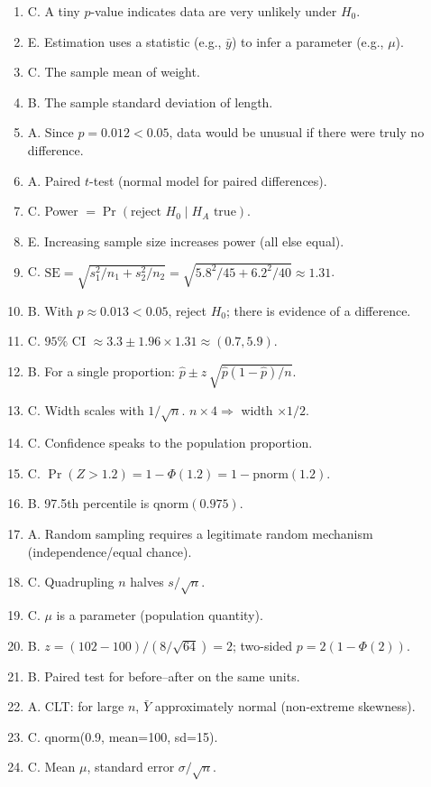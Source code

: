 \documentclass{article}
\begin{document}
\begin{enumerate}
\item C. A tiny $p$-value indicates data are very unlikely under $H_0$.
\item E. Estimation uses a statistic (e.g., $\bar y$) to infer a parameter (e.g., $\mu$).
\item C. The sample mean of weight.
\item B. The sample standard deviation of length.
\item A. Since $p=0.012<0.05$, data would be unusual if there were truly no difference.
\item A. Paired $t$-test (normal model for paired differences).
\item C. Power $=\Pr(\text{reject }H_0\mid H_A\text{ true})$.
\item E. Increasing sample size increases power (all else equal).
\item C. $\mathrm{SE}=\sqrt{s_1^2/n_1+s_2^2/n_2}=\sqrt{5.8^2/45+6.2^2/40}\approx 1.31$.
\item B. With $p\approx 0.013<0.05$, reject $H_0$; there is evidence of a difference.
\item C. $95\%$ CI $\approx 3.3 \pm 1.96\times 1.31 \approx (0.7,5.9)$.
\item B. For a single proportion: $\hat p \pm z\,\sqrt{\hat p(1-\hat p)/n}$.
\item C. Width scales with $1/\sqrt n$. $n \times 4 \Rightarrow$ width $\times 1/2$.
\item C. Confidence speaks to the population proportion.
\item C. $\Pr(Z>1.2)=1-\Phi(1.2)= 1 - \text{pnorm}(1.2)$.
\item B. 97.5th percentile is $\text{qnorm}(0.975)$.
\item A. Random sampling requires a legitimate random mechanism (independence/equal chance).
\item C. Quadrupling $n$ halves $s/\sqrt n$.
\item C. $\mu$ is a parameter (population quantity).
\item B. $z=(102-100)/(8/\sqrt{64})=2$; two-sided $p =2(1-\Phi(2))$.
\item B. Paired test for before–after on the same units.
\item A. CLT: for large $n$, $\bar Y$ approximately normal (non-extreme skewness).
\item C. qnorm(0.9, mean=100, sd=15).
\item C. Mean $\mu$, standard error $\sigma/\sqrt n$.
\end{enumerate}
\end{document}
